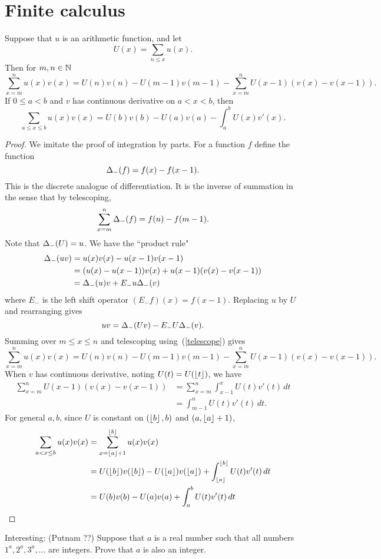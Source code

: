 \section{Finite calculus}
\begin{thm}
Suppose that $u$ is an arithmetic function, and let
\[
U(x)=\sum_{n\le x} u(x).
\]
Then for $m,n\in \mathbb{N}$ %
\[
\sum_{x=m}^n u(x)v(x)=U(n)v(n)-U(m-1)v(m-1) -\sum_{x=m}^n
U(x-1)(v(x)-v(x-1)).
\]
If $0\le a<b$ and $v$ has continuous derivative on $a<x<b$, then
\[
\sum_{a\le x\le b} u(x)v(x)=U(b)v(b)-U(a)v(a) -\int_{a}^b U(x)v'(x).
\]
\end{thm}
\begin{proof}
We imitate the proof of integration by parts. For a function $f$ define the function
\[
\Delta_-(f)=f(x)-f(x-1).
\]
This is the discrete analogue of differentiation. It is the inverse of summation in the sense that by telescoping,
\begin{equation}\label{telescope}
\sum_{x=m}^n\Delta_-(f)=f(n)-f(m-1).
\end{equation}
Note that $\Delta_-(U)=u$. 
We have the ``product rule"
\begin{align*}
\Delta_-(uv)&=u(x)v(x)-u(x-1)v(x-1)\\
&=(u(x)-u(x-1))v(x)+u(x-1)(v(x)-v(x-1))\\
&=\Delta_-(u)v+E_-u\Delta_-(v)
\end{align*}
where $E_-$ is the left shift operator $(E_-f)(x)=f(x-1)$. 
Replacing $u$ by $U$ and rearranging gives
\[
uv=\Delta_-(Uv)-E_-U\Delta_-(v).
\]
Summing over $m\le x\le n$ and telescoping using~(\ref{telescope}) gives
\[
\sum_{x=m}^n u(x)v(x)=U(n)v(n)-U(m-1)v(m-1) -\sum_{x=m}^n
U(x-1)(v(x)-v(x-1)).
\]
When $v$ has continuous derivative, noting $U(t)=U(\left\lfloor {t}\right\rfloor)$, we have
\begin{align*}
\sum_{x=m}^n
U(x-1)(v(x)-v(x-1))
&=\sum_{x=m}^n \int_{x-1}^{x}U(t)v'(t)\,dt\\
&=\int_{m-1}^n U(t)v'(t)\,dt.
\end{align*}
For general $a,b$, since $U$ is constant on $(\left\lfloor {b}\right\rfloor,b)$ and $(a,\left\lfloor {a}\right\rfloor+1)$,
\begin{align*}
\sum_{a<x\le b} u(x)v(x)
&=\sum_{x=\left\lfloor {a}\right\rfloor+1}^{\left\lfloor {b}\right\rfloor} u(x)v(x)\\
&=U(\left\lfloor {b}\right\rfloor)v(\left\lfloor {b}\right\rfloor) - U(\left\lfloor {a}\right\rfloor) v(\left\lfloor {a}\right\rfloor) +\int_{\left\lfloor {a}\right\rfloor}^{\left\lfloor {b}\right\rfloor} U(t)v'(t)\,dt\\
&=U(b)v(b) - U(a) v(a) +\int_{a}^{b} U(t)v'(t)\,dt\qedhere
\end{align*}
\end{proof}

Interesting: (Putnam ??) Suppose that $a$ is a real number such that all numbers $1^a,2^a,3^a,\ldots$ are integers. Prove that $a$ is also an integer.